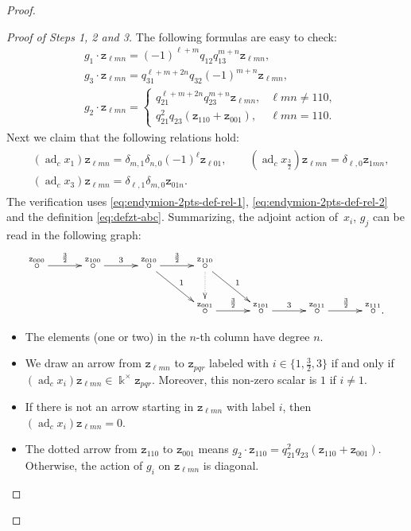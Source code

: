 \documentclass[pdftex]{sigma}
\numberwithin{equation}{section}
\newcommand{\adc}{\operatorname{ad}_c}
\newcommand{\zt}{\mathtt{z}}
\newcommand{\tresdos}{\frac{3}{2}}
\begin{document}
\begin{proof}
\begin{proof}[Proof of Steps 1, 2 and 3]
The following formulas are easy to check:
\begin{align*}
&g_1 \cdot \zt_{\ell mn} = (-1)^{\ell +m}q_{12}q_{13}^{m+n}\zt_{\ell mn},
\\ &g_3 \cdot \zt_{\ell mn} = q_{31}^{\ell +m+2n}q_{32}(-1)^{m+n}\zt_{\ell mn},
\\
&g_2 \cdot \zt_{\ell mn} = \begin{cases}
q_{21}^{\ell+m+2n}q_{23}^{m+n}\zt_{\ell mn}, & \ell mn\ne 110,
\\
q_{21}^2q_{23}(\zt_{110}+\zt_{001}), & \ell mn=110.
\end{cases}
\end{align*}
Next we claim that the following relations hold:
\begin{align}\label{eq:endymion-2pts-adc-on-z}
\begin{aligned}
&(\adc x_1)\zt_{\ell mn} = \delta_{m,1}\delta_{n,0}(-1)^{\ell }\zt_{\ell 01}, \qquad
(\adc x_{\tresdos})\zt_{\ell mn} = \delta_{\ell ,0}\zt_{1mn},
\\
&(\adc x_3)\zt_{\ell mn} = \delta_{\ell ,1}\delta_{m,0}\zt_{01n}.
\end{aligned}
\end{align}
The verification uses \eqref{eq:endymion-2pts-def-rel-1}, \eqref{eq:endymion-2pts-def-rel-2} and the definition \eqref{eq:defzt-abc}.
Summarizing, the adjoint action of~$x_i$, $g_j$ can be read in the following graph:
$$
\xymatrix@C=30pt{\overset{\zt_{000}}{\circ} \ar@{->}[r]^{\tresdos} &
\overset{\zt_{100}}{\circ} \ar@{->}[r]^{3} &
\overset{\zt_{010}}{\circ} \ar@{->}[r]^{\tresdos} \ar@{->}[rd]^{1} &
\overset{\zt_{110}}{\circ} \ar@{->}[rd]^{1} \ar@{.>}[d] &
& &
\\
& & &
\overset{\zt_{001}}{\circ} \ar@{->}[r]^{\tresdos} &
\overset{\zt_{101}}{\circ} \ar@{->}[r]^{3} &
\overset{\zt_{011}}{\circ} \ar@{->}[r]^{\tresdos} &
\overset{\zt_{111}}{\circ}. }
$$
\begin{itemize}[leftmargin=*]
\item The elements (one or two) in the $n$-th column have degree $n$.
\item We draw an arrow from $\zt_{\ell mn}$ to $\zt_{pqr}$ labeled with $i\in\big\{1,\tresdos,3\big\}$ if and only if
$(\adc x_i)\zt_{\ell mn}\in\Bbbk^{\times} \zt_{pqr}$. Moreover, this non-zero scalar is $1$ if $i\ne 1$.
\item If there is not an arrow starting in $\zt_{\ell mn}$ with label $i$, then $(\adc x_i)\zt_{\ell mn}=0$.
\item The dotted arrow from $\zt_{110}$ to $\zt_{001}$ means $g_2 \cdot \zt_{110}= q_{21}^2q_{23}(\zt_{110}+\zt_{001})$. Otherwise, the action of $g_i$ on $\zt_{\ell mn}$ is diagonal.
\end{itemize}


\end{proof}
\end{proof}
\end{document}
